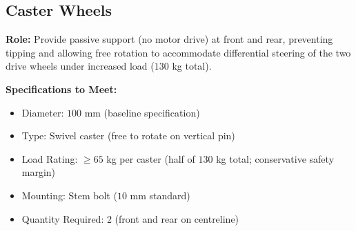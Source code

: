 \documentclass[12pt,a4paper]{article}
\begin{document}
\subsection{Caster Wheels}

\textbf{Role:} Provide passive support (no motor drive) at front and rear, preventing tipping and allowing free rotation to accommodate differential steering of the two drive wheels under increased load ($130$ kg total).

\textbf{Specifications to Meet:}
\begin{itemize}
\item Diameter: $100$ mm (baseline specification)
\item Type: Swivel caster (free to rotate on vertical pin)
\item Load Rating: $\geq 65$ kg per caster (half of $130$ kg total; conservative safety margin)
\item Mounting: Stem bolt ($10$ mm standard)
\item Quantity Required: $2$ (front and rear on centreline)
\end{itemize}
\end{document}
